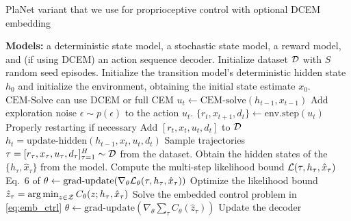 \documentclass{article}
\begin{document}
\begin{algorithm*}[t]
  \caption{PlaNet \citep{hafner2018learning} variant that we use for proprioceptive control
    with optional DCEM embedding}
\label{alg:planet-proprio}
\begin{algorithmic}
  \LeftComment \textbf{Models:}
  a deterministic state model, a stochastic state model,
  a reward model, and (if using DCEM) an action sequence decoder.
  \LeftComment Initialize dataset ${\mathcal{D}}$ with $S$ random seed episodes.
  \LeftComment Initialize the transition model's deterministic hidden
  state $h_0$ and initialize the environment, obtaining the
  initial state estimate $x_0$.
  \LeftComment $\text{CEM-Solve}$ can use DCEM or full CEM
  \State $u_t \leftarrow \text{CEM-solve}(h_{t-1}, x_{t-1})$
  \State Add exploration noise $\epsilon\sim p(\epsilon)$ to the action $u_t$.
  \State $\{r_t, x_{t+1}, d_t\} \leftarrow \text{env.step}(u_t)$ \Comment Properly restarting if necessary
  \State Add $[r_t, x_t, u_t, d_t]$ to ${\mathcal{D}}$
  \State $h_t=\text{update-hidden}(h_{t-1}, x_t, u_t, d_t)$
    \State Sample trajectories $\tau = [r_\tau, x_\tau, u_\tau, d_\tau]_{\tau=1}^H \sim {\mathcal{D}}$ from the dataset.
    \State Obtain the hidden states of the $\{h_\tau,\hat x_\tau\}$ from the model.
    \State Compute the multi-step likelihood bound $\mathcal{L}(\tau, h_\tau, \hat x_\tau)$ \Comment Eq.~6 of \citet{hafner2018learning}
    \State $\theta \leftarrow \text{grad-update}(\nabla_\theta \mathcal{L}_\theta(\tau, h_\tau, \hat x_\tau))$
    \Comment Optimize the likelihood bound
      \State $\hat z_\tau = \operatorname*{arg\,min}_{z\in {\mathcal{Z}}} C_\theta(z; h_\tau, \hat x_\tau)$
      \Comment Solve the embedded control problem in \cref{eq:emb_ctrl}
      \State $\theta \leftarrow \text{grad-update}(\nabla_\theta \sum_\tau C_\theta(\hat z_\tau))$
    \Comment Update the decoder
    \EndIf
  \EndIf
  \EndFor
\end{algorithmic}
\end{algorithm*}
\end{document}
